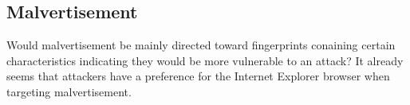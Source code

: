 \subsection{Malvertisement}

Would malvertisement be mainly directed toward
fingerprints conaining certain characteristics
indicating they would be more vulnerable to an attack?
It already seems that attackers have a preference
for the Internet Explorer browser
when targeting malvertisement.
\citep{li2012knowing}
